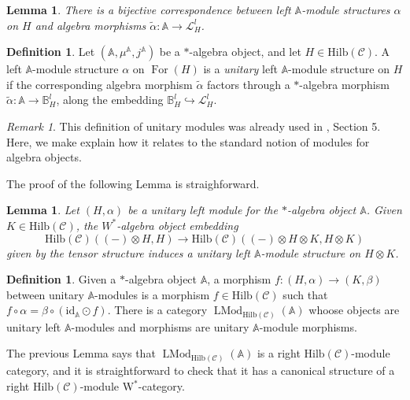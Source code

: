 \documentclass[a4paper,11pt,reqno]{amsart}
\numberwithin{equation}{section}
\newtheorem{lemma}[theorem]{Lemma}
\theoremstyle{remark}
\newtheorem{remark}[theorem]{Remark}
\theoremstyle{definition}
\newtheorem{definition}[theorem]{Definition}
\newcommand{\bA}{\mathbb A}
\newcommand{\bB}{\mathbb B}
\newcommand{\cC}{\mathcal C}
\newcommand{\cL}{\mathcal L}
\DeclareMathOperator{\For}{For}
\DeclareMathOperator{\LMod}{LMod}
\newcommand{\id}{\mathrm{id}}
\newcommand{\Hilb}{\mathrm{Hilb}}
\begin{document}
\begin{lemma}
	There is a bijective correspondence between left $\bA$-module structures $\alpha$ on $H$ and algebra morphisms $\tilde{\alpha}:\bA \to \cL^ l_H$.
	\label{lemma:correspondenceleftmoduleandalgebramorphism}
\end{lemma}



\begin{definition}
	Let $(\bA,\mu^\bA, j^\bA)$ be a $*$-algebra object, and let $H \in \Hilb(\cC)$. A left $\bA$-module structure $\alpha$ on $\For(H)$ is a {\em unitary} left $\bA$-module structure on $H$ if the corresponding algebra morphism $\tilde{\alpha}$ factors through a $*$-algebra morphism $\tilde{\alpha}: \bA \to \bB^l_H$, along the embedding $\bB^l_H \hookrightarrow \cL^ l_H$. 
\end{definition}

\begin{remark}
	This definition of unitary modules was already used in \cite{MR3687214}, Section 5. Here, we make explain how it relates to the standard notion of modules for algebra objects.
\end{remark}


\medskip




The proof of the following Lemma is straighforward.

\begin{lemma}
	Let $(H,\alpha)$ be a unitary left module for the $*$-algebra object $\bA$. Given $K \in \Hilb(\cC)$, the $W^*$-algebra object embedding
	\[
	\Hilb(\cC)((-) \otimes H,H) \to \Hilb(\cC)((-) \otimes H \otimes K, H \otimes K)
	\]
	given by the tensor structure induces a unitary left $\bA$-module structure on $H \otimes K$. 
	\label{lemma:amplificationunitarymodules}
\end{lemma}


\begin{definition}
	Given a $*$-algebra object $\bA$, a morphism $f: (H,\alpha) \to (K,\beta)$ between unitary $\bA$-modules is a morphism $f \in \Hilb(\cC)$ such that $f \circ \alpha = \beta \circ (\id_\bA \odot f)$. There is a category $\LMod_{\Hilb(\cC)}(\bA)$ whoose objects are unitary left $\bA$-modules and morphisms are unitary $\bA$-module morphisms. 
\end{definition} 

The previous Lemma says that $\LMod_{\Hilb(\cC)}(\bA)$ is a right $\Hilb(\cC)$-module category, and it is straightforward to check that it has a canonical structure of a right $\Hilb(\cC)$-module W$^*$-category.
\end{document}
